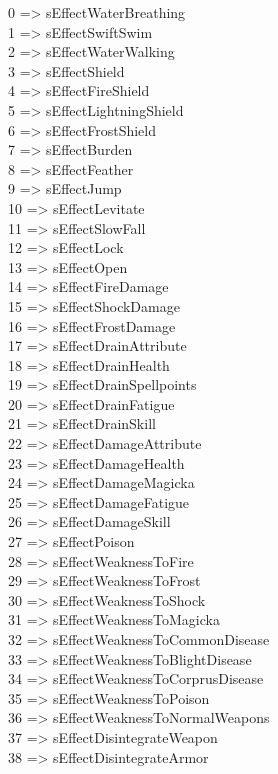 0 => sEffectWaterBreathing\\
1 => sEffectSwiftSwim\\
2 => sEffectWaterWalking\\
3 => sEffectShield\\
4 => sEffectFireShield\\
5 => sEffectLightningShield\\
6 => sEffectFrostShield\\
7 => sEffectBurden\\
8 => sEffectFeather\\
9 => sEffectJump\\
10 => sEffectLevitate\\
11 => sEffectSlowFall\\
12 => sEffectLock\\
13 => sEffectOpen\\
14 => sEffectFireDamage\\
15 => sEffectShockDamage\\
16 => sEffectFrostDamage\\
17 => sEffectDrainAttribute\\
18 => sEffectDrainHealth\\
19 => sEffectDrainSpellpoints\\
20 => sEffectDrainFatigue\\
21 => sEffectDrainSkill\\
22 => sEffectDamageAttribute\\
23 => sEffectDamageHealth\\
24 => sEffectDamageMagicka\\
25 => sEffectDamageFatigue\\
26 => sEffectDamageSkill\\
27 => sEffectPoison\\
28 => sEffectWeaknessToFire\\
29 => sEffectWeaknessToFrost\\
30 => sEffectWeaknessToShock\\
31 => sEffectWeaknessToMagicka\\
32 => sEffectWeaknessToCommonDisease\\
33 => sEffectWeaknessToBlightDisease\\
34 => sEffectWeaknessToCorprusDisease\\
35 => sEffectWeaknessToPoison\\
36 => sEffectWeaknessToNormalWeapons\\
37 => sEffectDisintegrateWeapon\\
38 => sEffectDisintegrateArmor\\
